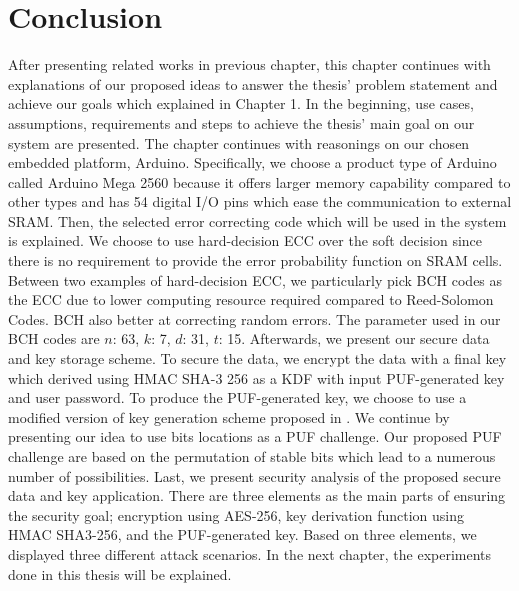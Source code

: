 %

\section{Conclusion}
After presenting related works in previous chapter, this chapter continues with explanations of our proposed ideas to answer the thesis' problem statement and achieve our goals which explained in Chapter 1. In the beginning, use cases, assumptions, requirements and steps to achieve the thesis' main goal on our system are presented.
The chapter continues with reasonings on our chosen embedded platform, Arduino. Specifically, we choose a product type of Arduino called Arduino Mega 2560 because it offers larger memory capability compared to other types and has 54 digital I/O pins which ease the communication to external SRAM.
Then, the selected error correcting code which will be used in the system is explained. We choose to use hard-decision ECC over the soft decision since there is no requirement to provide the error probability function on SRAM cells. Between two examples of hard-decision ECC, we particularly pick BCH codes as the ECC due to lower computing resource required compared to Reed-Solomon Codes. BCH also better at correcting random errors. The parameter used in our BCH codes are $n$: 63, $k$: 7, $d$: 31, $t$: 15.
Afterwards, we present our secure data and key storage scheme. To secure the data, we encrypt the data with a final key which derived using HMAC SHA-3 256 as a KDF with input PUF-generated key and user password. To produce the PUF-generated key, we choose to use a modified version of key generation scheme proposed in \cite{cryptographic_key_generation}.
We continue by presenting our idea to use bits locations as a PUF challenge. Our proposed PUF challenge are based on the permutation of stable bits which lead to a numerous number of possibilities.
Last, we present security analysis of the proposed secure data and key application. There are three elements as the main parts of ensuring the security goal; encryption using AES-256, key derivation function using HMAC SHA3-256, and the PUF-generated key. Based on three elements, we displayed three different attack scenarios.
In the next chapter, the experiments done in this thesis will be explained.
